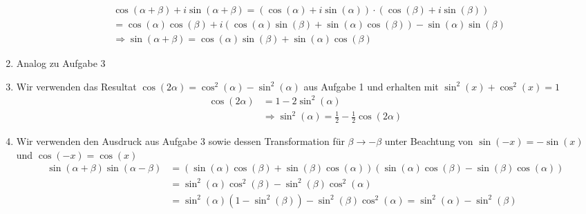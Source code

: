 \documentclass[12pt]{exam}
\begin{document}
\begin{questions}
\begin{solution}
\begin{enumerate}
	\begin{align*}
		&\cos(\alpha+\beta)+i\sin(\alpha+\beta)=(\cos(\alpha)+i\sin(\alpha))\cdot(\cos(\beta)+i\sin(\beta))\\
		&=\cos(\alpha)\cos(\beta)+i(\cos(\alpha)\sin(\beta)+\sin(\alpha)\cos(\beta))-\sin(\alpha)\sin(\beta)\\
		&\Rightarrow\sin(\alpha+\beta)=\cos(\alpha)\sin(\beta)+\sin(\alpha)\cos(\beta)
	\end{align*}
	\item Analog zu Aufgabe 3
	\item Wir verwenden das Resultat $\cos(2\alpha)=\cos^2(\alpha)-\sin^2(\alpha)$ aus Aufgabe 1 und erhalten mit $\sin^2(x)+\cos^2(x)=1$
	\begin{align*}
		\cos(2\alpha)&=1-2\sin^2(\alpha)\\
		&\Rightarrow\sin^2(\alpha)=\frac{1}{2}-\frac{1}{2}\cos(2\alpha)
	\end{align*}
	\item Wir verwenden den Ausdruck aus Aufgabe 3 sowie dessen Transformation für $\beta\rightarrow-\beta$ unter Beachtung von $\sin(-x)=-\sin(x)$ und $\cos(-x)=\cos(x)$
	\begin{align*}
		\sin(\alpha+\beta)\sin(\alpha-\beta)&=(\sin(\alpha)\cos(\beta)+\sin(\beta)\cos(\alpha))(\sin(\alpha)\cos(\beta)-\sin(\beta)\cos(\alpha))\\
		&=\sin^2(\alpha)\cos^2(\beta)-\sin^2(\beta)\cos^2(\alpha)\\
		&=\sin^2(\alpha)(1-\sin^2(\beta))-\sin^2(\beta)\cos^2(\alpha)=\sin^2(\alpha)-\sin^2(\beta)
	\end{align*}
	\end{enumerate}
\end{solution}







\end{questions}
\end{document}
